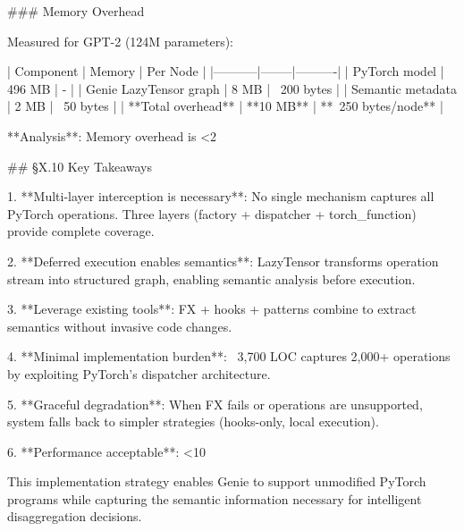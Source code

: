 ### Memory Overhead

Measured for GPT-2 (124M parameters):

| Component | Memory | Per Node |
|-----------|--------|----------|
| PyTorch model | 496 MB | - |
| Genie LazyTensor graph | 8 MB | ~200 bytes |
| Semantic metadata | 2 MB | ~50 bytes |
| **Total overhead** | **10 MB** | **~250 bytes/node** |

**Analysis**: Memory overhead is <2%

## §X.10 Key Takeaways

1. **Multi-layer interception is necessary**: No single mechanism captures all PyTorch operations. Three layers (factory + dispatcher + torch_function) provide complete coverage.

2. **Deferred execution enables semantics**: LazyTensor transforms operation stream into structured graph, enabling semantic analysis before execution.

3. **Leverage existing tools**: FX + hooks + patterns combine to extract semantics without invasive code changes.

4. **Minimal implementation burden**: ~3,700 LOC captures 2,000+ operations by exploiting PyTorch's dispatcher architecture.

5. **Graceful degradation**: When FX fails or operations are unsupported, system falls back to simpler strategies (hooks-only, local execution).

6. **Performance acceptable**: <10%

This implementation strategy enables Genie to support unmodified PyTorch programs while capturing the semantic information necessary for intelligent disaggregation decisions.
